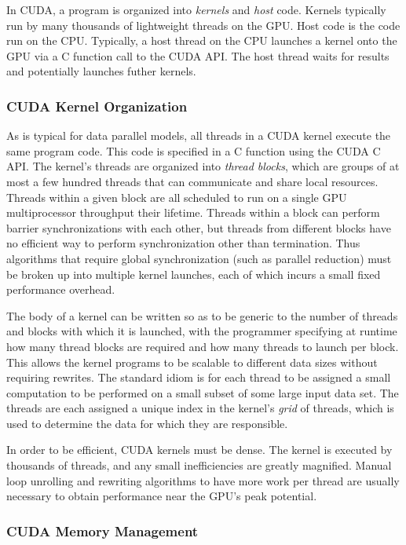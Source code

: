 \documentclass[preprint]{sigplanconf}
\begin{document}
In CUDA, a program is organized into {\it kernels} and {\it host} code.
Kernels typically run by many thousands of
lightweight threads on the GPU.  Host code is the code run on the CPU.
Typically, a host thread on the CPU launches a kernel onto the GPU via a C
function call to the CUDA API.  The host thread waits for results and
potentially launches futher kernels.

\subsubsection{CUDA Kernel Organization}

As is typical for data parallel models, all threads in a CUDA kernel execute
the same program code.  This code is specified in a C function using the CUDA C
API. The kernel's threads are organized into {\it thread blocks}, which are
groups of at most a few hundred threads that can communicate and share local
resources. Threads within a given block are all scheduled to run on a single GPU
multiprocessor throughput their lifetime.  Threads within a block can
perform barrier synchronizations with each other, but threads from different
blocks have no efficient way to perform synchronization other than termination.
Thus algorithms that require global synchronization (such as parallel reduction)
must be broken up into multiple kernel launches, each of which incurs a small
fixed performance overhead.

The body of a kernel can be written so as to be generic to the number of
threads and blocks with which it is launched, with the programmer specifying at
runtime how many thread blocks are required and how many threads to launch per
block. This allows the kernel programs to be scalable to different data sizes
without requiring rewrites. The standard idiom is for each thread to
be assigned a small computation to be performed on a small subset of some large
input data set.  The threads are each assigned a unique index in the kernel's
{\it grid} of threads, which is used to determine the data for which they are
responsible.

In order to be efficient, CUDA kernels must be dense.  The kernel is executed
by thousands of threads, and any small inefficiencies are greatly magnified.
Manual loop unrolling and rewriting algorithms to have more work per thread are
usually necessary to obtain performance near the GPU's peak potential.

\subsubsection{CUDA Memory Management}
\end{document}
